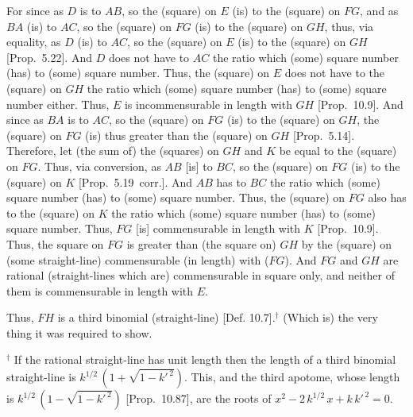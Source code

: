 \begin{Parallel}{}{}
{For since as $D$ is to $AB$, so the (square) on $E$ (is) to the (square)
on $FG$, and as $BA$ (is) to $AC$, so the (square) on $FG$ (is) to
the (square) on $GH$, thus, via equality, as $D$ (is) to $AC$, so the
(square) on $E$ (is) to the (square) on $GH$ [Prop.~5.22]. And $D$ does not have to $AC$ the
ratio which (some) square number (has) to (some) square number.
Thus, the (square) on $E$ does not have to the (square) on $GH$ the ratio
which (some) square number (has) to (some) square number either.
Thus, $E$ is incommensurable in length with $GH$ [Prop.~10.9].  And since as $BA$ is to $AC$,
so the (square) on $FG$ (is) to the (square) on $GH$, the (square) on 
$FG$ (is) thus greater than the (square) on $GH$ [Prop.~5.14]. Therefore, let (the sum of) the (squares)
on $GH$ and $K$
be equal to the (square) on $FG$. Thus, via
conversion, as $AB$ [is] to $BC$, so the (square) on $FG$ (is) to the
(square) on $K$ [Prop.~5.19~corr.]. And $AB$
has to $BC$ the ratio which (some) square number (has) to (some) square
number. Thus, the (square) on $FG$ also has to the (square) on $K$
the ratio which (some) square number (has) to (some) square number.
Thus,  $FG$ [is] commensurable in length with $K$ [Prop.~10.9]. Thus, the square on
$FG$ is greater than (the square on) $GH$ by the (square) on
(some straight-line) commensurable (in length) with ($FG$). And $FG$ and $GH$
are rational (straight-lines which are) commensurable in square only,
and neither of them is commensurable in length with $E$.

Thus, $FH$ is a third binomial (straight-line) [Def. 10.7].$^\dag$ (Which is) the very thing it
was required to show.}
\end{Parallel}
{\footnotesize\noindent$^\dag$ If the rational straight-line has unit length then the length of a third binomial straight-line
is  $k^{1/2}\,(1+\sqrt{1-{k'}^{\,2}})$. This, and the third apotome,
whose length is $k^{1/2}\,(1-\sqrt{1-{k'}^{\,2}})$ [Prop.~10.87],
are the roots of $x^2- 2\,k^{1/2}\,x+k\,{k'}^{\,2}=0$.}

